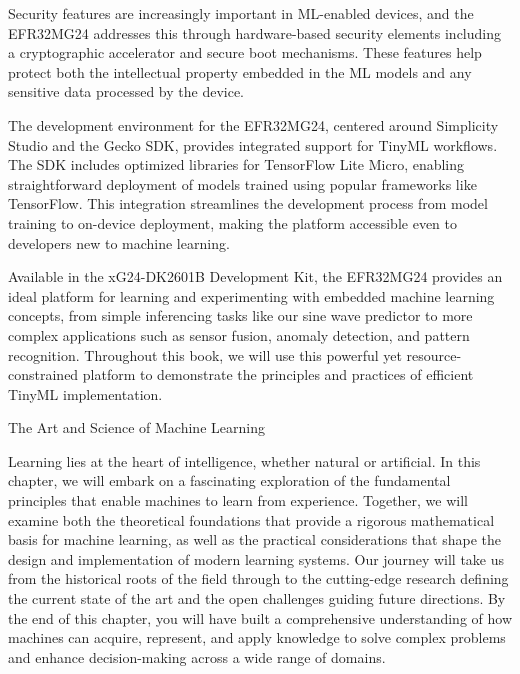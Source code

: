 \documentclass[
  9pt,
  letterpaper,
  abstract,
  titlepage]{scrbook}
\makeatletter
\renewcommand\chapter{\clearpage\global\@topnum\z@
\@afterindentfalse \secdef\@chapter\@schapter}
\newif\if@firstnumbered%
\newif\if@firstunnumbered%
\newcounter{lastRomanPage}
\let\old@chapter\chapter%
\renewcommand{\chapter}{%
  \@ifstar{\unnumbered@chapter}{\numbered@chapter}%
}
\newcommand{\numbered@chapter}[1]{%
  \if@firstnumbered%
    \cleardoublepage%
    \setcounter{lastRomanPage}{\value{page}}%
    \pagenumbering{arabic}%
    \@firstnumberedfalse%
  \else
    \setcounter{page}{\value{page}}%
  \fi
  \old@chapter{#1}%
}
\newcommand{\unnumbered@chapter}[1]{%
  \if@firstunnumbered%
    \clearpage
    \setcounter{lastRomanPage}{\value{page}}%
    \pagenumbering{roman}%
    \@firstunnumberedfalse%
  \fi
  \old@chapter*{#1}%
}
\makeatother
\begin{document}
Security features are increasingly important in ML-enabled devices, and
the EFR32MG24 addresses this through hardware-based security elements
including a cryptographic accelerator and secure boot mechanisms. These
features help protect both the intellectual property embedded in the ML
models and any sensitive data processed by the device.

The development environment for the EFR32MG24, centered around
Simplicity Studio and the Gecko SDK, provides integrated support for
TinyML workflows. The SDK includes optimized libraries for TensorFlow
Lite Micro, enabling straightforward deployment of models trained using
popular frameworks like TensorFlow. This integration streamlines the
development process from model training to on-device deployment, making
the platform accessible even to developers new to machine learning.

Available in the xG24-DK2601B Development Kit, the EFR32MG24 provides an
ideal platform for learning and experimenting with embedded machine
learning concepts, from simple inferencing tasks like our sine wave
predictor to more complex applications such as sensor fusion, anomaly
detection, and pattern recognition. Throughout this book, we will use
this powerful yet resource-constrained platform to demonstrate the
principles and practices of efficient TinyML implementation.

\chapter{The Art and Science of Machine
Learning}\label{the-art-and-science-of-machine-learning}

Learning lies at the heart of intelligence, whether natural or
artificial. In this chapter, we will embark on a fascinating exploration
of the fundamental principles that enable machines to learn from
experience. Together, we will examine both the theoretical foundations
that provide a rigorous mathematical basis for machine learning, as well
as the practical considerations that shape the design and implementation
of modern learning systems. Our journey will take us from the historical
roots of the field through to the cutting-edge research defining the
current state of the art and the open challenges guiding future
directions. By the end of this chapter, you will have built a
comprehensive understanding of how machines can acquire, represent, and
apply knowledge to solve complex problems and enhance decision-making
across a wide range of domains.
\end{document}
